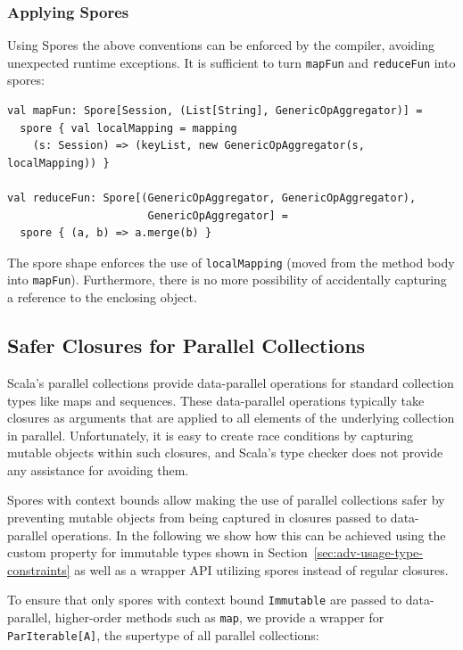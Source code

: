\documentclass{llncs}
\begin{document}
\subsubsection{Applying Spores}

Using Spores the above conventions can be enforced by the compiler, avoiding unexpected runtime exceptions. It is sufficient to turn \verb|mapFun| and \verb|reduceFun| into spores:

\begin{lstlisting}
val mapFun: Spore[Session, (List[String], GenericOpAggregator)] =
  spore { val localMapping = mapping
    (s: Session) => (keyList, new GenericOpAggregator(s, localMapping)) }

val reduceFun: Spore[(GenericOpAggregator, GenericOpAggregator),
                      GenericOpAggregator] =
  spore { (a, b) => a.merge(b) }
\end{lstlisting}
\noindent
The spore shape enforces the use of \verb|localMapping| (moved from the method body into \verb|mapFun|). Furthermore, there is no more possibility of accidentally capturing a reference to the enclosing object.


\subsection{Safer Closures for Parallel Collections}

Scala's parallel collections provide data-parallel operations for standard collection types like maps and sequences. These data-parallel operations typically take closures as arguments that are applied to all elements of the underlying collection in parallel. Unfortunately, it is easy to create race conditions by capturing mutable objects within such closures, and Scala's type checker does not provide any assistance for avoiding them.

Spores with context bounds allow making the use of parallel collections safer by preventing mutable objects from being captured in closures passed to data-parallel operations. In the following we show how this can be achieved using the custom property for immutable types shown in Section~\ref{sec:adv-usage-type-constraints} as well as a wrapper API utilizing spores instead of regular closures.

To ensure that only spores with context bound \verb|Immutable| are passed to data-parallel, higher-order methods such as \verb|map|, we provide a wrapper for \verb|ParIterable[A]|, the supertype of all parallel collections:
\end{document}
